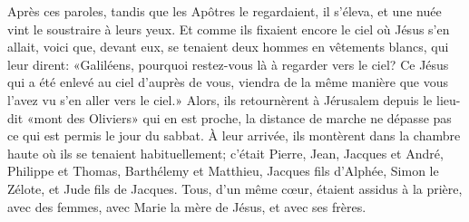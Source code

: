 Après ces paroles, tandis que les Apôtres le regardaient,
	il s’éleva, et une nuée vint le soustraire à leurs yeux.
Et comme ils fixaient encore le ciel où Jésus s’en allait,
	voici que, devant eux, se tenaient deux hommes en vêtements blancs,
	qui leur dirent: «Galiléens,
	pourquoi restez-vous là à regarder vers le ciel?
	Ce Jésus qui a été enlevé au ciel d’auprès de vous,
	viendra de la même manière que vous l’avez vu s’en aller vers le ciel.»
Alors, ils retournèrent à Jérusalem
		depuis le lieu-dit «mont des Oliviers» qui en est proche,
	la distance de marche ne dépasse pas ce qui est permis le jour du sabbat.
À leur arrivée,
	ils montèrent dans la chambre haute où ils se tenaient habituellement;
	c’était Pierre, Jean, Jacques et André,
	Philippe et Thomas, Barthélemy et Matthieu,
	Jacques fils d’Alphée, Simon le Zélote, et Jude fils de Jacques.
Tous, d’un même cœur, étaient assidus à la prière,
	avec des femmes, avec Marie la mère de Jésus, et avec ses frères.
